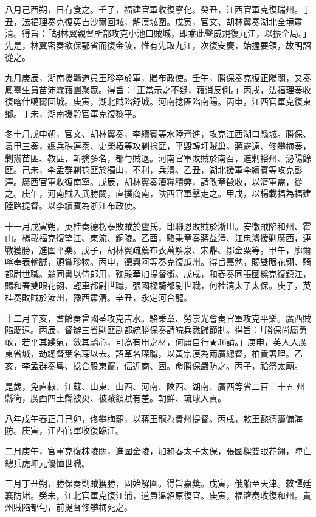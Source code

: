 \begin{pinyinscope}
八月己酉朔，日有食之。壬子，福建官軍收復寧化。癸丑，江西官軍克復瑞州。丁丑，法福理奏克復英吉沙爾回城，解漢城圍。戊寅，官文、胡林翼奏湖北全境肅清。得旨：「胡林翼親督所部攻克小池口賊城，即乘此聲威規復九江，以振全局。」先是，林翼密奏欲保鄂省而復金陵，惟有先取九江，次復安慶，始握要領，故明詔從之。

九月庚辰，湖南援贛道員王珍卒於軍，贈布政使。壬午，勝保奏克復正陽關，又奏鳳臺生員苗沛霖藉團聚眾。得旨：「正當示之不疑，藉消反側。」丙戌，法福理奏收復喀什噶爾回城。庚寅，湖北賊陷舒城。河南捻匪陷南陽。丙申，江西官軍克復東鄉。丁未，湖南援黔官軍克復黎平。

冬十月戊申朔，官文、胡林翼奏，李續賓等水陸齊進，攻克江西湖口縣城。勝保、袁甲三奏，總兵硃連泰、史榮椿等攻剿捻匪，平毀韓圩賊巢。蔣霨遠、佟攀梅奏，剿辦苗匪、教匪，斬擒多名，都勻賊退。河南官軍敗賊於南召，進剿裕州、泌陽餘匪。己未，李孟群剿捻匪於獨山，不利，兵潰。乙丑，湖北援軍李續賓等攻克彭澤。廣西官軍收復南寧。戊辰，胡林翼奏漕糧積弊，請改章徵收，以濟軍需，從之。庚午，河南賊入武勝關，直撲商南，陜西官軍擊走之。甲戌，以楊載福為福建陸路提督。以李續賓為浙江布政使。

十一月戊寅朔，英桂奏德楞泰敗賊於盧氏，邱聯恩敗賊於淅川。安徽賊陷和州、霍山。楊載福克復望江、東流、銅陵。乙酉，駱秉章奏蔣益澧、江忠濬援剿廣西，連戰獲勝，進圍平樂。戊子，胡林翼疏薦布衣萬斛泉、宋鼎、鄒金粟等。甲午，廓爾喀奉表輸誠，頒賞珍物。丙申，德興阿等奏克復瓜州。得旨嘉勉，賜雙眼花翎、騎都尉世職。翁同書以侍郎用，鞠殿華加提督銜。戊戌，和春奏同張國樑克復鎮江，賜和春雙眼花翎、輕車都尉世職，張國樑騎都尉世職，何桂清太子太保。庚子，英桂奏敗賊於汝州，豫西肅清。辛丑，永定河合龍。

十二月辛亥，耆齡奏曾國荃攻克吉水。駱秉章、勞崇光會奏官軍攻克平樂。廣西賊陷慶遠。丙辰，督辦三省剿匪副都統勝保奏請皖兵悉歸節制。得旨：「勝保尚屬勇敢，若平其躁氣，斂其驕心，可為有用之材，何庸自行★J6請。」庚申，英人入廣東省城，劫總督葉名琛以去。詔革名琛職，以黃宗漢為兩廣總督，柏貴署理。乙亥，李孟群奏粵、捻合股東竄，偪近商、固。命勝保嚴防之。丙子，祫祭太廟。

是歲，免直隸、江蘇、山東、山西、河南、陜西、湖南、廣西等省二百三十五州縣衛，廣西四土縣被災、被賊額賦有差。朝鮮、琉球入貢。

八年戊午春正月己卯，佟攀梅罷，以蔣玉龍為貴州提督。丙戌，敕王懿德籌備海防。庚寅，江西官軍收復臨江。

二月庚午，官軍克復秣陵關，進圍金陵，加和春太子太保，張國樑雙眼花翎，陣亡總兵虎坤元優恤世職。

三月丁丑朔，勝保奏剿賊獲勝，固始解圍。得旨嘉獎。戊寅，俄船至天津。敕譚廷襄防堵。癸未，江北官軍克復江浦，道員溫紹原復官。庚寅，福濟奏收復和州。貴州賊陷都勻，前提督佟攀梅死之。


\end{pinyinscope}
